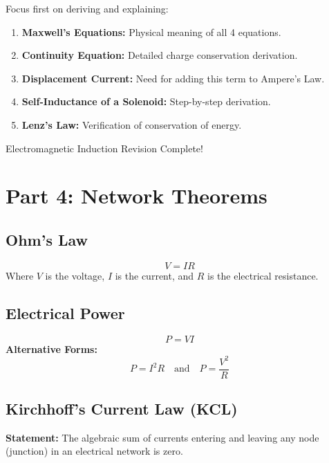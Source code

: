 \documentclass[11pt,a4paper]{article}
\begin{document}
\newpage
\begin{prioritybox}
    Focus first on deriving and explaining:
    \begin{enumerate}[label=\textbf{\arabic*.}]
        \item \textbf{Maxwell's Equations:} Physical meaning of all 4 equations.
        \item \textbf{Continuity Equation:} Detailed charge conservation derivation.
        \item \textbf{Displacement Current:} Need for adding this term to Ampere's Law.
        \item \textbf{Self-Inductance of a Solenoid:} Step-by-step derivation.
        \item \textbf{Lenz's Law:} Verification of conservation of energy.
    \end{enumerate}
\end{prioritybox}

\begin{successbox}
    Electromagnetic Induction Revision Complete! \checkmark
\end{successbox}

\newpage
\section{Part 4: Network Theorems}

\subsection{Ohm's Law}
\begin{formulabox}
    \[ V = IR \]
    Where $V$ is the voltage, $I$ is the current, and $R$ is the electrical resistance.
\end{formulabox}

\subsection{Electrical Power}
\begin{formulabox}
    \[ P = VI \]
    \textbf{Alternative Forms:}
    \[ P = I^2 R \quad \text{and} \quad P = \frac{V^2}{R} \]
\end{formulabox}

\subsection{Kirchhoff's Current Law (KCL)}
\begin{pyqbox}
    \textbf{Statement:} The algebraic sum of currents entering and leaving any node (junction) in an electrical network is zero.
\end{pyqbox}
\end{document}
